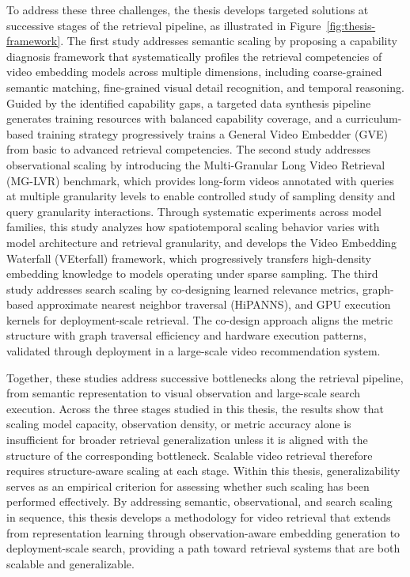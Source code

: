 To address these three challenges, the thesis develops targeted solutions at successive stages of the retrieval pipeline, as illustrated in Figure~\ref{fig:thesis-framework}. The first study addresses semantic scaling by proposing a capability diagnosis framework that systematically profiles the retrieval competencies of video embedding models across multiple dimensions, including coarse-grained semantic matching, fine-grained visual detail recognition, and temporal reasoning. Guided by the identified capability gaps, a targeted data synthesis pipeline generates training resources with balanced capability coverage, and a curriculum-based training strategy progressively trains a General Video Embedder (GVE) from basic to advanced retrieval competencies. The second study addresses observational scaling by introducing the Multi-Granular Long Video Retrieval (MG-LVR) benchmark, which provides long-form videos annotated with queries at multiple granularity levels to enable controlled study of sampling density and query granularity interactions. Through systematic experiments across model families, this study analyzes how spatiotemporal scaling behavior varies with model architecture and retrieval granularity, and develops the Video Embedding Waterfall (VEterfall) framework, which progressively transfers high-density embedding knowledge to models operating under sparse sampling. The third study addresses search scaling by co-designing learned relevance metrics, graph-based approximate nearest neighbor traversal (HiPANNS), and GPU execution kernels for deployment-scale retrieval. The co-design approach aligns the metric structure with graph traversal efficiency and hardware execution patterns, validated through deployment in a large-scale video recommendation system.

Together, these studies address successive bottlenecks along the retrieval pipeline, from semantic representation to visual observation and large-scale search execution. Across the three stages studied in this thesis, the results show that scaling model capacity, observation density, or metric accuracy alone is insufficient for broader retrieval generalization unless it is aligned with the structure of the corresponding bottleneck. Scalable video retrieval therefore requires structure-aware scaling at each stage. Within this thesis, generalizability serves as an empirical criterion for assessing whether such scaling has been performed effectively. By addressing semantic, observational, and search scaling in sequence, this thesis develops a methodology for video retrieval that extends from representation learning through observation-aware embedding generation to deployment-scale search, providing a path toward retrieval systems that are both scalable and generalizable.

